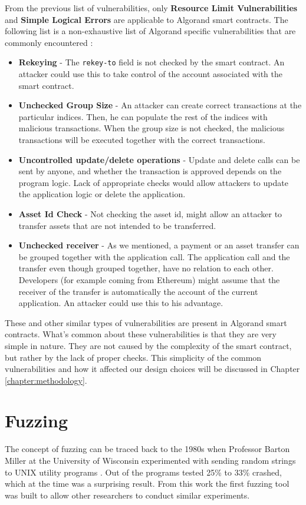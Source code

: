 From the previous list of vulnerabilities, only \textbf{Resource Limit Vulnerabilities} and \textbf{Simple Logical Errors} are applicable to Algorand smart contracts. The following list is a non-exhaustive list of Algorand specific vulnerabilities that are commonly encountered \cite{crytic_building-secure-contractsnot-so-smart-contractsalgorand_nodate,sun_panda_2023}:
\begin{itemize}
    \item \textbf{Rekeying} - The \texttt{rekey-to} field is not checked by the smart contract. An attacker could use this to take control of the account associated with the smart contract.
    \item \textbf{Unchecked Group Size} - An attacker can create correct transactions at the particular indices. Then, he can populate the rest of the indices with malicious transactions. When the group size is not checked, the malicious transactions will be executed together with the correct transactions.
    \item \textbf{Uncontrolled update/delete operations} - Update and delete calls can be sent by anyone, and whether the transaction is approved depends on the program logic. Lack of appropriate checks would allow attackers to update the application logic or delete the application.
    \item \textbf{Asset Id Check} - Not checking the asset id, might allow an attacker to transfer assets that are not intended to be transferred.
    \item \textbf{Unchecked receiver} - As we mentioned, a payment or an asset transfer can be grouped together with the application call. The application call and the transfer even though grouped together, have no relation to each other. Developers (for example coming from Ethereum) might assume that the receiver of the transfer is automatically the account of the current application. An attacker could use this to his advantage.
\end{itemize}

These and other similar types of vulnerabilities are present in Algorand smart contracts.
What's common about these vulnerabilities is that they are very simple in nature.
They are not caused by the complexity of the smart contract, but rather by the lack of proper checks.
This simplicity of the common vulnerabilities and how it affected our design choices will be discussed in Chapter \ref{chapter:methodology}.

\section{Fuzzing} \label{section:fuzzing}
The concept of fuzzing can be traced back to the 1980s when Professor Barton Miller at the University of Wisconsin experimented with sending random strings to UNIX utility programs \cite{miller_empirical_1990}.
Out of the programs tested 25\% to 33\% crashed, which at the time was a surprising result.
From this work the first fuzzing tool was built to allow other researchers to conduct similar experiments.


